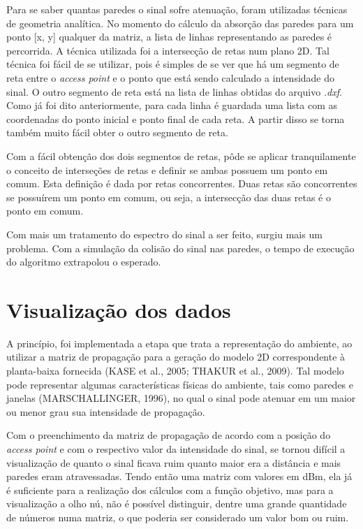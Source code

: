 \documentclass[
	12pt,				%
	openright,			%
	twoside,			%
	a4paper,			%
	english,			%
	french,				%
	spanish,			%
	brazil				%
	]{abntex2}
\begin{document}
Para se saber quantas paredes o sinal sofre atenuação, foram utilizadas técnicas de geometria analítica. No momento do cálculo da absorção das paredes para um ponto [x, y] qualquer da matriz, a lista de linhas representando as paredes é percorrida. A técnica utilizada foi a  intersecção de retas num plano 2D. Tal técnica foi fácil de se utilizar, pois é simples de se ver que há um segmento de reta entre o \textit{access point} e o ponto que está sendo calculado a intensidade do sinal. O outro segmento de reta está na lista de linhas obtidas do arquivo \textit{.dxf}. Como já foi dito anteriormente, para cada linha é guardada uma lista com as coordenadas do ponto inicial e ponto final de cada reta. A partir disso se torna também muito fácil obter o outro segmento de reta.

Com a fácil obtenção dos dois segmentos de retas, pôde se aplicar tranquilamente o conceito de interseções de retas e definir se ambas possuem um ponto em comum. Esta definição é dada por retas concorrentes. Duas retas são concorrentes se possuírem um ponto em comum, ou seja, a intersecção das duas retas é o ponto em comum.

Com mais um tratamento do espectro do sinal a ser feito, surgiu mais um problema. Com a simulação da colisão do sinal nas paredes, o tempo de execução do algoritmo extrapolou o esperado. 


\section[Visualização dos dados]{Visualização dos dados}

A princípio, foi implementada a etapa que trata a representação do ambiente, ao utilizar a matriz de propagação para a geração do modelo 2D correspondente à planta-baixa fornecida (KASE et al., 2005; THAKUR et al., 2009). Tal modelo pode representar algumas características físicas do ambiente, tais como paredes e janelas (MARSCHALLINGER, 1996), no qual o sinal pode atenuar em um maior ou menor grau sua intensidade de propagação.

Com o preenchimento da matriz de propagação de acordo com a posição do \textit{access point} e com o respectivo valor da intensidade do sinal, se tornou difícil a visualização de quanto o sinal ficava ruim quanto maior era a distância e mais paredes eram atravessadas. Tendo então uma matriz com valores em dBm, ela já é suficiente para a realização dos cálculos com a função objetivo, mas para a visualização a olho nú, não é possível distinguir, dentre uma grande quantidade de números numa matriz, o que poderia ser considerado um valor bom ou ruim.
\end{document}
